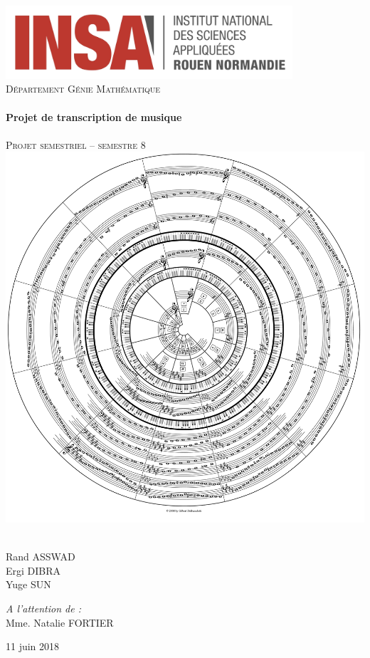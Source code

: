\begin{titlepage}
  \begin{sffamily}
  \begin{center}
	\includegraphics[width=0.8\textwidth]{img/INSA_logo}\\[2cm]

    \textsc{\huge Département Génie Mathématique}\\[0.7cm]

    \HRule \\[0.4cm]
    {\huge \bfseries Projet de transcription de musique \\[0.4cm]}
    \HRule \\[1cm]
	\textsc{\huge Projet semestriel -- semestre 8}\\[0.7cm]

    \includegraphics[width=.6\textwidth]{img/cover_img.png}~\\[1cm]

    \begin{minipage}{0.4\textwidth}
		\Large\raggedright
        Rand ASSWAD\\
		Ergi DIBRA\\
		Yuge SUN
    \end{minipage}
    \begin{minipage}{0.4\textwidth}
		\Large\raggedleft
		\emph{A l'attention de :}\\
		Mme. Natalie FORTIER
    \end{minipage}

	\vfill
    {\large 11 juin 2018}
  \end{center}
  \end{sffamily}
\end{titlepage}

